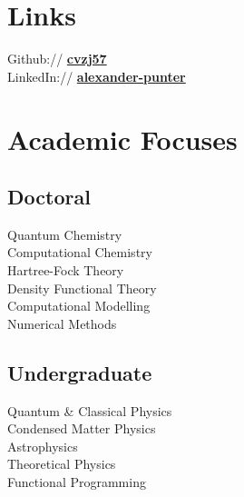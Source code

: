\documentclass[letterpaper]{deedy-resume} %
\begin{document}
\begin{minipage}[t]{0.33\textwidth}
\section{Links} 

Github:// \href{https://github.com/cvzj57}{\bf cvzj57} \\
LinkedIn:// \href{https://www.linkedin.com/in/alexander-punter/}{\bf alexander-punter} \\

\sectionspace %


\section[]{Academic Focuses}

\subsection{Doctoral}

Quantum Chemistry \\
Computational Chemistry \\
Hartree-Fock Theory \\
Density Functional Theory \\
Computational Modelling \\
Numerical Methods \\

\sectionspace %


\subsection{Undergraduate}

Quantum \& Classical Physics \\
Condensed Matter Physics \\
Astrophysics \\
Theoretical Physics \\
Functional Programming \\


\end{minipage}
\end{document}
